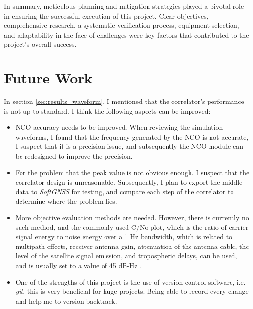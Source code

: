
In summary, meticulous planning and mitigation strategies played a pivotal role in ensuring the successful execution of this project. Clear objectives, comprehensive research, a systematic verification process, equipment selection, and adaptability in the face of challenges were key factors that contributed to the project's overall success.

\section{Future Work}
In section \ref{sec:results_waveform}, I mentioned that the correlator's performance is not up to standard. I think the following aspects can be improved:

\begin{itemize}
    \item NCO accuracy needs to be improved. When reviewing the simulation waveforms, I found that the frequency generated by the NCO is not accurate, I suspect that it is a precision issue, and subsequently the NCO module can be redesigned to improve the precision.
    \item For the problem that the peak value is not obvious enough. I suspect that the correlator design is unreasonable. Subsequently, I plan to export the middle data to \textit{SoftGNSS} for testing, and compare each step of the correlator to determine where the problem lies.
    \item More objective evaluation methods are needed. However, there is currently no such method, and the commonly used C/No plot, which is the ratio of carrier signal energy to noise energy over a 1 Hz bandwidth, which is related to multipath effects, receiver antenna gain, attenuation of the antenna cable, the level of the satellite signal emission, and tropospheric delays, can be used, and is usually set to a value of 45 dB-Hz \cite{RN211}.
    \item One of the strengths of this project is the use of version control software, i.e. \textit{git}. this is very beneficial for huge projects. Being able to record every change and help me to version backtrack.
\end{itemize}
